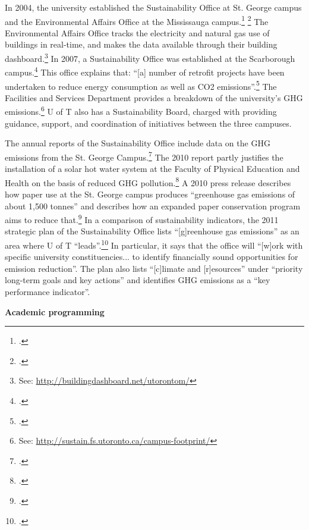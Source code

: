 In 2004, the university established the Sustainability Office at St. George campus and the Environmental Affairs Office at the Mississauga campus.\footcite[][]{UTSustOffice} \footcite[][]{}
The Environmental Affairs Office tracks the electricity and natural gas use of buildings in real-time, and makes the data available through their building dashboard.\footnote{See: \url{http://buildingdashboard.net/utorontom/}}
In 2007, a Sustainability Office was established at the Scarborough campus.\footcite[See: ][]{UTSustOffice}
This office explains that: ``[a] number of retrofit projects have been undertaken to reduce energy consumption as well as CO2 emissions''.\footcite[][]{UTSustOfficeEnergy}
The Facilities and Services Department provides a breakdown of the university's GHG emissions.\footnote{See: \url{http://sustain.fs.utoronto.ca/campus-footprint/}}
U of T also has a Sustainability Board, charged with providing guidance, support, and coordination of initiatives between the three campuses.



The annual reports of the Sustainability Office include data on the GHG emissions from the St. George Campus.\footcite[][]{UTSustOffice2010report}
The 2010 report partly justifies the installation of a solar hot water system at the Faculty of Physical Education and Health on the basis of reduced GHG pollution.\footcite[][p. 17]{UTSustOffice2010report}
A 2010 press release describes how paper use at the St. George campus produces ``greenhouse gas emissions of about 1,500 tonnes'' and describes how an expanded paper conservation program aims to reduce that.\footcite[][]{UTGoingGreener2010}
In a comparison of sustainability indicators, the 2011 strategic plan of the Sustainability Office lists ``[g]reenhouse gas emissions'' as an area where U of T ``leads''.\footcite[][p. 1]{UTSustOfficePlan}
In particular, it says that the office will ``[w]ork with specific university constituencies... to identify financially sound opportunities for emission reduction''.
The plan also lists ``[c]limate and [r]esources'' under ``priority long-term goals and key actions'' and identifies GHG emissions as a ``key performance indicator''.




\textbf{Academic programming}
\label{UofTAcademicProgramming}


